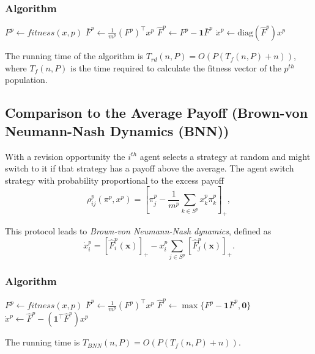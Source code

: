 \documentclass[a4paper,10pt]{article}
\def\th{^{th}}
\newcommand{\bs}[1]{\boldsymbol{#1}}
\def\th{^{th}}
\begin{document}
\subsubsection*{Algorithm}

\begin{algorithm}[H]

 \BlankLine
 
  {
  $ F^p \leftarrow fitness(x, p)$\;
  $ \bar{F}^p \leftarrow \frac{1}{m^p} (F^p)^\top x^p$\;
  $ \hat{F}^p \leftarrow F^p - \boldsymbol{1} \bar{F}^p$\;
  $ \dot{x}^p \leftarrow \text{diag}(\hat{F}^p) x^p $\;
 }
\end{algorithm}
%
The running time of the algorithm is $T_{rd}(n, P) = O( P (  T_{f}(n,P) + n) ) $, where $T_{f}(n,P)$ is the time required to calculate the fitness vector of the $p\th$ population.








\subsection{Comparison to the Average Payoff (Brown-von Neumann-Nash Dynamics (BNN))}

With a revision opportunity the $i\th$ agent selects a strategy at random and might switch to it if that strategy has a payoff above the average. The agent switch strategy with probability proportional to the excess payoff
%
\begin{equation}
\rho_{ij}^p(\pi^p, x^p) = \left[ \pi_j^p - \frac{1}{m^p} \sum_{k\in S^p} x_k^p \pi_k^p \right]_+,
\end{equation}

This protocol leads to \emph{Brown-von Neumann-Nash dynamics}, defined as 
\begin{equation}\label{eq:bnn}
 \dot{x}_i^p = \left[ \hat{F}_i^p \left( \bs{x} \right) \right]_+ - x_i^p  \sum_{j \in S^p} \left[ \hat{F}_j^p \left( \bs{x} \right) \right]_+.
\end{equation}



\subsubsection*{Algorithm}

\begin{algorithm}[H]

 \BlankLine
 
  {
  $ F^p \leftarrow fitness(x, p)$\;
  $ \bar{F}^p \leftarrow \frac{1}{m^p} (F^p)^\top x^p$\;
  $ \hat{F}^p \leftarrow \max\{F^p - \boldsymbol{1} \bar{F}^p, \boldsymbol{0}\}$\;
  $ \dot{x}^p \leftarrow \hat{F}^p - (\boldsymbol{1}^\top \hat{F}^p) x^p $\;
 }
\end{algorithm}
%
The running time is $T_{BNN}(n,P) = O( P (  T_{f}(n,P) + n) ) $.
\end{document}
